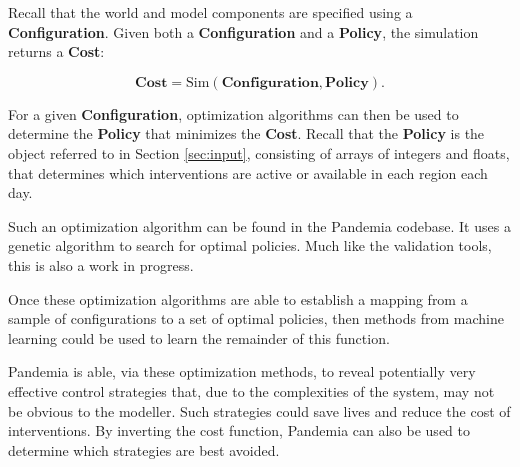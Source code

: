\documentclass[10pt,letterpaper]{article}
\begin{document}
Recall that the world and model components are specified using a \textbf{Configuration}. Given both a \textbf{Configuration} and a \textbf{Policy}, the simulation returns a \textbf{Cost}:

$$\textbf{Cost} = \text{Sim}(\textbf{Configuration}, \textbf{Policy}).$$

For a given \textbf{Configuration}, optimization algorithms can then be used to determine the \textbf{Policy} that minimizes the \textbf{Cost}. Recall that the \textbf{Policy} is the object referred to in Section \ref{sec:input}, consisting of arrays of integers and floats, that determines which interventions are active or available in each region each day.

Such an optimization algorithm can be found in the Pandemia codebase. It uses a genetic algorithm to search for optimal policies. Much like the validation tools, this is also a work in progress.

Once these optimization algorithms are able to establish a mapping from a sample of configurations to a set of optimal policies, then methods from machine learning could be used to learn the remainder of this function.

Pandemia is able, via these optimization methods, to reveal potentially very effective control strategies that, due to the complexities of the system, may not be obvious to the modeller. Such strategies could save lives and reduce the cost of interventions. By inverting the cost function, Pandemia can also be used to determine which strategies are best avoided.

% 
\end{document}

